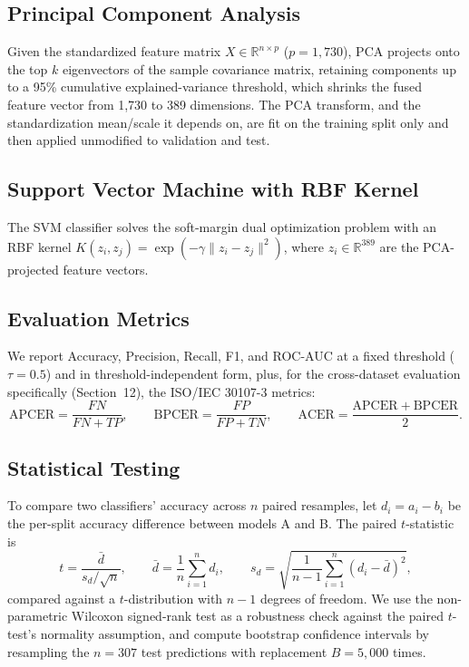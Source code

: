 \documentclass[11pt]{article}
\begin{document}
\subsection{Principal Component Analysis}

Given the standardized feature matrix $X\in\mathbb{R}^{n\times p}$ ($p=1{,}730$), PCA projects onto the top $k$ eigenvectors of the sample covariance matrix, retaining components up to a 95\% cumulative explained-variance threshold, which shrinks the fused feature vector from 1,730 to 389 dimensions. The PCA transform, and the standardization mean/scale it depends on, are fit on the training split only and then applied unmodified to validation and test.

\subsection{Support Vector Machine with RBF Kernel}

The SVM classifier solves the soft-margin dual optimization problem with an RBF kernel $K(z_i,z_j)=\exp(-\gamma\lVert z_i-z_j\rVert^2)$, where $z_i\in\mathbb{R}^{389}$ are the PCA-projected feature vectors.

\subsection{Evaluation Metrics}

We report Accuracy, Precision, Recall, F1, and ROC-AUC at a fixed threshold ($\tau=0.5$) and in threshold-independent form, plus, for the cross-dataset evaluation specifically (Section~12), the ISO/IEC 30107-3 metrics:
\begin{equation}
\mathrm{APCER} = \frac{FN}{FN+TP}, \qquad
\mathrm{BPCER} = \frac{FP}{FP+TN}, \qquad
\mathrm{ACER} = \frac{\mathrm{APCER}+\mathrm{BPCER}}{2}.
\end{equation}

\subsection{Statistical Testing}

To compare two classifiers' accuracy across $n$ paired resamples, let $d_i = a_i - b_i$ be the per-split accuracy difference between models A and B. The paired $t$-statistic is
\begin{equation}
t = \frac{\bar{d}}{s_d/\sqrt{n}}, \qquad
\bar{d} = \frac{1}{n}\sum_{i=1}^{n} d_i, \qquad
s_d = \sqrt{\frac{1}{n-1}\sum_{i=1}^{n}(d_i-\bar d)^2},
\end{equation}
compared against a $t$-distribution with $n-1$ degrees of freedom. We use the non-parametric Wilcoxon signed-rank test as a robustness check against the paired $t$-test's normality assumption, and compute bootstrap confidence intervals by resampling the $n=307$ test predictions with replacement $B=5{,}000$ times.
\end{document}
